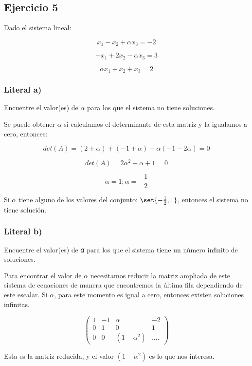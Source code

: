 \documentclass[
  letterpaper,
  DIV=11,
  numbers=noendperiod]{scrartcl}
\begin{document}
\subsection{Ejercicio 5}\label{ejercicio-5}

Dado el sistema lineal:

\[x_1 - x_2 + \alpha x_3 = -2\]

\[- x_1 + 2x_2 - \alpha x_3 = 3\]

\[\alpha x_1 + x_2 + x_3 = 2\]

\subsubsection{Literal a)}\label{literal-a-4}

Encuentre el valor(es) de \(\alpha\) para los que el sistema no tiene
soluciones.

Se puede obtener \(\alpha\) si calculamos el determinante de esta matriz
y la igualamos a cero, entonces:

\[det(A) = (2 + \alpha) + (-1 + \alpha) + \alpha (- 1 - 2 \alpha) = 0\]

\[det(A) = 2 \alpha^{2} - \alpha + 1 = 0\]

\[\alpha = 1      ;     \alpha = - \frac{1}{2}\]

Si \(\alpha\) tiene alguno de los valores del conjunto:
\(\set{-\frac{1}{2}, 1}\), entonces el sistema no tiene solución.

\subsubsection{Literal b)}\label{literal-b-4}

Encuentre el valor(es) de 𝛼 para los que el sistema tiene un número
infinito de soluciones.

Para encontrar el valor de \(\alpha\) necesitamos reducir la matriz
ampliada de este sistema de ecuaciones de manera que encontremos la
última fila dependiendo de este escalar. Si \(\alpha\), para este
momento es igual a cero, entonces existen soluciones infinitas.

\[\begin{pmatrix} 1 & -1 & \alpha & -2 \\ 0 & 1 & 0 & 1 \\ 0 & 0 & (1 - \alpha^{2}) & .... \end{pmatrix}\]

Esta es la matriz reducida, y el valor \((1 - \alpha^{2})\) es lo que
nos interesa.
\end{document}
